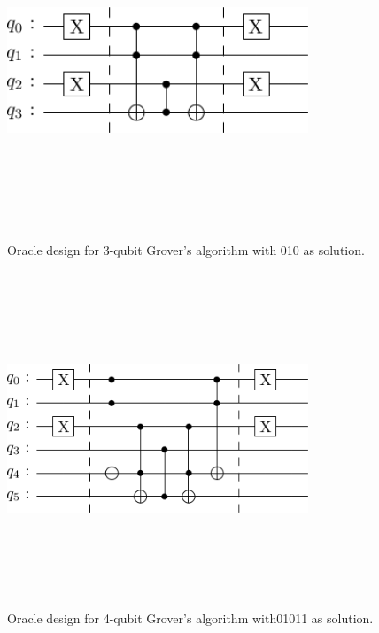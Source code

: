 \documentclass[conference]{IEEEtran}
\begin{document}
\begin{figure}[htbp]
	\centerline{\includegraphics[width=9cm,height=10cm,keepaspectratio]{3-qubit-010.png}}
	\caption{Oracle design for 3-qubit Grover’s algorithm with 010 as solution.}
	\label{fig:3-qubit}
\end{figure}

\begin{figure}[htbp]
	\centerline{\includegraphics[width=9cm,height=10cm,keepaspectratio]{4-qubit-0101.png}}
	\caption{Oracle design for 4-qubit Grover's algorithm with01011 as solution.}
	\label{fig:4-qubit}
\end{figure}
\end{document}
